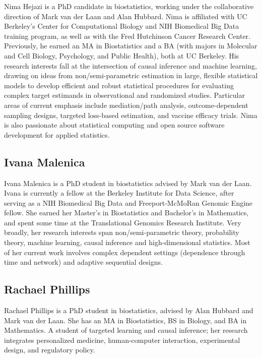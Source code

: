 \documentclass[12pt, krantz2,]{book}
\theoremstyle{definition}
\theoremstyle{definition}
\theoremstyle{definition}
\newcommand{\1}{\mathbbm{1}}
\begin{document}
Nima Hejazi is a PhD candidate in biostatistics, working under the collaborative
direction of Mark van der Laan and Alan Hubbard. Nima is affiliated with UC
Berkeley's Center for Computational Biology and NIH Biomedical Big Data training
program, as well as with the Fred Hutchinson Cancer Research Center. Previously,
he earned an MA in Biostatistics and a BA (with majors in Molecular and Cell
Biology, Psychology, and Public Health), both at UC Berkeley. His research
interests fall at the intersection of causal inference and machine learning,
drawing on ideas from non/semi-parametric estimation in large, flexible
statistical models to develop efficient and robust statistical procedures for
evaluating complex target estimands in observational and randomized studies.
Particular areas of current emphasis include mediation/path analysis,
outcome-dependent sampling designs, targeted loss-based estimation, and vaccine
efficacy trials. Nima is also passionate about statistical computing and open
source software development for applied statistics.

\hypertarget{ivana-malenica}{%
\subsection*{Ivana Malenica}\label{ivana-malenica}}


Ivana Malenica is a PhD student in biostatistics advised by Mark van der Laan.
Ivana is currently a fellow at the Berkeley Institute for Data Science, after
serving as a NIH Biomedical Big Data and Freeport-McMoRan Genomic Engine fellow.
She earned her Master's in Biostatistics and Bachelor's in Mathematics, and
spent some time at the Translational Genomics Research Institute. Very broadly,
her research interests span non/semi-parametric theory, probability theory,
machine learning, causal inference and high-dimensional statistics. Most of her
current work involves complex dependent settings (dependence through time and
network) and adaptive sequential designs.

\hypertarget{rachael-phillips}{%
\subsection*{Rachael Phillips}\label{rachael-phillips}}


Rachael Phillips is a PhD student in biostatistics, advised by Alan Hubbard and
Mark van der Laan. She has an MA in Biostatistics, BS in Biology, and BA in
Mathematics. A student of targeted learning and causal inference; her research
integrates personalized medicine, human-computer interaction, experimental
design, and regulatory policy.
\end{document}
